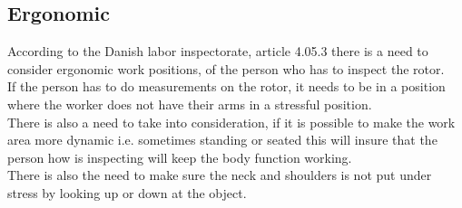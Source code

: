 \subsection{Ergonomic}
According to the Danish labor inspectorate, article 4.05.3 there is a need to consider ergonomic work positions, of the person who has to inspect the rotor.\\
If the person has to do measurements on the rotor, it needs to be in a position where the worker does not have their arms in a stressful position.\\
There is also a need to take into consideration, if it is possible to make the work area more dynamic i.e. sometimes standing or seated this will insure that the person how is inspecting will keep the body function working.\\
There is also the need to make sure the neck and shoulders is not put under stress by looking up or down at the object\cite{ATpostions}.

